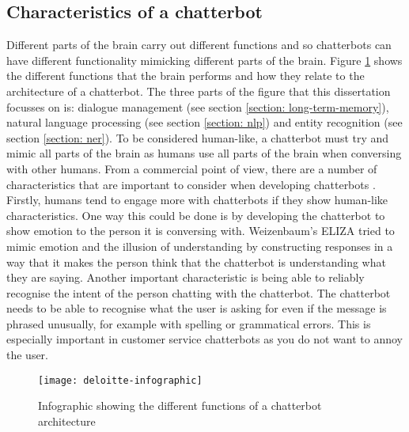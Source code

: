 \subsection{Characteristics of a chatterbot}
Different parts of the brain carry out different functions and so chatterbots can have different functionality mimicking different parts of the brain. Figure \ref{fig:deloitte-infographic} shows the different functions that the brain performs and how they relate to the architecture of a chatterbot. The three parts of the figure that this dissertation focusses on is: dialogue management (see section \ref{section: long-term-memory}), natural language processing (see section \ref{section: nlp}) and entity recognition (see section \ref{section: ner}). To be considered human-like, a chatterbot must try and mimic all parts of the brain as humans use all parts of the brain when conversing with other humans. From a commercial point of view, there are a number of characteristics that are important to consider when developing chatterbots \autocite{deloitte-chatbots2018}. Firstly, humans tend to engage more with chatterbots if they show human-like characteristics. One way this could be done is by developing the chatterbot to show emotion to the person it is conversing with. Weizenbaum's ELIZA tried to mimic emotion and the illusion of understanding by constructing responses in a way that it makes the person think that the chatterbot is understanding what they are saying. Another important characteristic is being able to reliably recognise the intent of the person chatting with the chatterbot. The chatterbot needs to be able to recognise what the user is asking for even if the message is phrased unusually, for example with spelling or grammatical errors. This is especially important in customer service chatterbots as you do not want to annoy the user.

\begin{figure}[h]
	\centering
	\texttt{[image: deloitte-infographic]}
	\caption{Infographic showing the different functions of a chatterbot architecture \autocite{deloitte-chatbots2018}}
	\label{fig:deloitte-infographic}
\end{figure}
